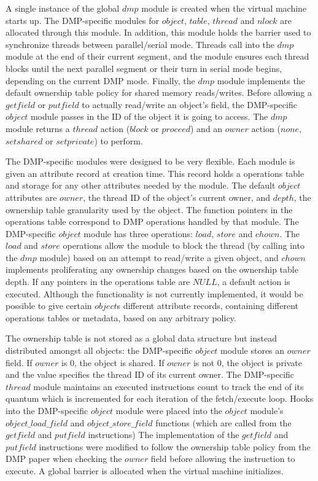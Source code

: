 
A single instance of the global $dmp$ module is created when the
virtual machine starts up.  The DMP-specific modules for $object$,
$table$, $thread$ and $nlock$ are allocated through this module.  In
addition, this module holds the barrier used to synchronize threads
between parallel/serial mode.  Threads call into the $dmp$ module at
the end of their current segment, and the module ensures each thread
blocks until the next parallel segment or their turn in serial mode
begins, depending on the current DMP mode.  Finally, the $dmp$ module
implements the default ownership table policy for shared memory
reads/writes.  Before allowing a $getfield$ or $putfield$ to actually
read/write an object's field, the DMP-specific $object$ module passes
in the ID of the object it is going to access.  The $dmp$ module
returns a $thread$ action ($block$ or $proceed$) and an $owner$ action
($none$, $set shared$ or $set private$) to perform.

The DMP-specific modules were designed to be very flexible.  Each
module is given an attribute record at creation time.  This record
holds a operations table and storage for any other attributes needed
by the module.  The default $object$ attributes are $owner$, the
thread ID of the object's current owner, and $depth$, the ownership
table granularity used by the object.  The function pointers in the
operations table correspond to DMP operations handled by that module.
The DMP-specific $object$ module has three operations: $load$, $store$
and $chown$.  The $load$ and $store$ operations allow the module to
block the thread (by calling into the $dmp$ module) based on an
attempt to read/write a given object, and $chown$ implements
proliferating any ownership changes based on the ownership table
depth.  If any pointers in the operations table are $NULL$, a default
action is executed.  Although the functionality is not currently
implemented, it would be possible to give certain $object$s different
attribute records, containing different operations tables or metadata,
based on any arbitrary policy.

The ownership table is not stored as a global data structure but
instead distributed amongst all objects: the DMP-specific $object$
module stores an $owner$ field.  If $owner$ is $0$, the object is
shared.  If $owner$ is not $0$, the object is private and the value
specifies the thread ID of its current owner.  The DMP-specific
$thread$ module maintains an executed instructions count to track the
end of its quantum which is incremented for each iteration of the
fetch/execute loop.  Hooks into the DMP-specific $object$ module were
placed into the $object$ module's $object\_load\_field$ and
$object\_store\_field$ functions (which are called from the $getfield$
and $putfield$ instructions)  The implementation of the $getfield$ and
$putfield$ instructions were modified to follow the ownership table
policy from the DMP paper when checking the $owner$ field before
allowing the instruction to execute.  A global barrier is allocated
when the virtual machine initializes.  

